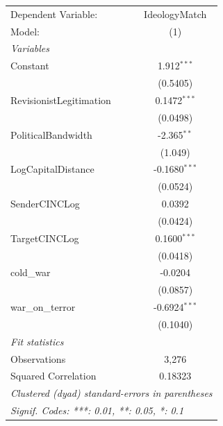 
\begingroup
\centering
\begin{tabular}{lc}
   \tabularnewline \midrule \midrule
   Dependent Variable:     & IdeologyMatch\\  
   Model:                  & (1)\\  
   \midrule
   \emph{Variables}\\
   Constant                & 1.912$^{***}$\\   
                           & (0.5405)\\   
   RevisionistLegitimation & 0.1472$^{***}$\\   
                           & (0.0498)\\   
   PoliticalBandwidth      & -2.365$^{**}$\\   
                           & (1.049)\\   
   LogCapitalDistance      & -0.1680$^{***}$\\   
                           & (0.0524)\\   
   SenderCINCLog           & 0.0392\\   
                           & (0.0424)\\   
   TargetCINCLog           & 0.1600$^{***}$\\   
                           & (0.0418)\\   
   cold\_war               & -0.0204\\   
                           & (0.0857)\\   
   war\_on\_terror         & -0.6924$^{***}$\\   
                           & (0.1040)\\   
   \midrule
   \emph{Fit statistics}\\
   Observations            & 3,276\\  
   Squared Correlation     & 0.18323\\  
   \midrule \midrule
   \multicolumn{2}{l}{\emph{Clustered (dyad) standard-errors in parentheses}}\\
   \multicolumn{2}{l}{\emph{Signif. Codes: ***: 0.01, **: 0.05, *: 0.1}}\\
\end{tabular}
\par\endgroup



